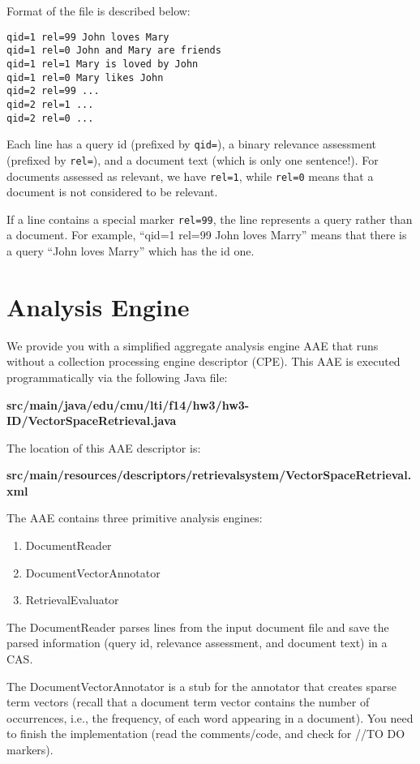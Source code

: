 \documentclass[oneside,11pt]{memoir}
\begin{document}
Format of the file is described below:

\begin{verbatim}
qid=1 rel=99 John loves Mary 
qid=1 rel=0 John and Mary are friends
qid=1 rel=1 Mary is loved by John
qid=1 rel=0 Mary likes John
qid=2 rel=99 ...
qid=2 rel=1 ...
qid=2 rel=0 ...
\end{verbatim}

Each line has a query id (prefixed by \texttt{qid=}), 
a binary relevance assessment (prefixed by \texttt{rel=}), 
and a document text (which is only one sentence!). 
For documents assessed as relevant, we have \texttt{rel=1},
while \texttt{rel=0} means that a document is not considered to be relevant.

If a line contains a special marker \texttt{rel=99},
the line represents a query rather than a document.
For example, ``qid=1 rel=99 John loves Marry'' means
that there is a query ``John loves Marry'' which has the id one.

\section{Analysis Engine}
\label{SectionAe}
We provide you with a simplified aggregate analysis engine AAE that runs without 
a collection processing engine descriptor (CPE).
This AAE is executed programmatically via the following Java file:

\begin{center}\textbf{src/main/java/edu/cmu/lti/f14/hw3/hw3-ID/VectorSpaceRetrieval.java} \end{center}

The location of this AAE descriptor is:

\begin{center}\textbf{src/main/resources/descriptors/retrievalsystem/VectorSpaceRetrieval.xml} \end{center}

The AAE contains three primitive analysis engines:
\begin{enumerate}
\item DocumentReader
\item DocumentVectorAnnotator
\item RetrievalEvaluator
\end{enumerate}

The DocumentReader parses lines from the input document file and save the parsed information (query id, relevance assessment, and document text) in a CAS.

The DocumentVectorAnnotator is a stub for the annotator that creates sparse term vectors
(recall that a document term vector contains the number of occurrences, i.e., the frequency,
of each word appearing in a document). 
You need to finish the implementation (read the comments/code, and check for //TO DO markers).
\end{document}

